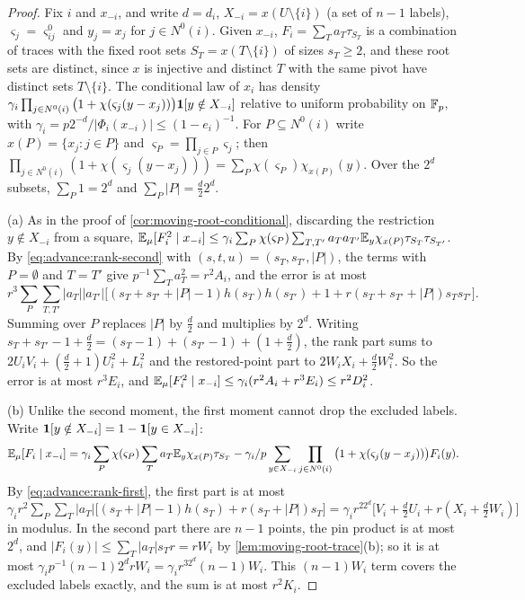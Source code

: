 \begin{proof}
Fix $i$ and $x_{-i}$, and write $d=d_i$, $X_{-i}=x(U\setminus\{i\})$ (a set of
$n-1$ labels), $\varsigma_j=\varsigma^0_{ij}$ and $y_j=x_j$ for $j\in N^0(i)$.
Given $x_{-i}$, $F_i=\sum_Ta_T\tau_{S_T}$ is a combination of traces with the
fixed root sets $S_T=x(T\setminus\{i\})$ of sizes $s_T\ge2$, and these root sets
are distinct, since $x$ is injective and distinct $T$ with the same pivot have
distinct sets $T\setminus\{i\}$. The conditional law of $x_i$ has density
$\gamma_i\prod_{j\in N^0(i)}\big(1+\chi(\varsigma_j(y-x_j))\big)\mathbf 1[y\notin X_{-i}]$
relative to uniform probability on $\mathbb F_p$, with
$\gamma_i=p2^{-d}/|\Phi_i(x_{-i})|\le(1-e_i)^{-1}$. For $P\subseteq N^0(i)$ write
$x(P)=\{x_j:j\in P\}$ and $\varsigma_P=\prod_{j\in P}\varsigma_j$; then
$\prod_{j\in N^0(i)}(1+\chi(\varsigma_j(y-x_j)))=\sum_P\chi(\varsigma_P)\chi_{x(P)}(y)$.
Over the $2^d$ subsets, $\sum_P1=2^d$ and $\sum_P|P|=\frac d22^d$.

(a) As in the proof of \cref{cor:moving-root-conditional}, discarding the
restriction $y\notin X_{-i}$ from a square,
$\mathbb E_\mu[F_i^2\mid x_{-i}]\le\gamma_i\sum_P\chi(\varsigma_P)\sum_{T,T'}a_Ta_{T'}
\mathbb E_y\chi_{x(P)}\tau_{S_T}\tau_{S_{T'}}$. By \eqref{eq:advance:rank-second} with
$(s,t,u)=(s_T,s_{T'},|P|)$, the terms with $P=\emptyset$ and $T=T'$ give
$p^{-1}\sum_Ta_T^2=r^2A_i$, and the error is at most
\[
  r^3\sum_P\sum_{T,T'}|a_T||a_{T'}|\Big[(s_T+s_{T'}+|P|-1)h(s_T)h(s_{T'})+1
  +r(s_T+s_{T'}+|P|)s_Ts_{T'}\Big].
\]
Summing over $P$ replaces $|P|$ by $\frac d2$ and multiplies by $2^d$. Writing
$s_T+s_{T'}-1+\frac d2=(s_T-1)+(s_{T'}-1)+(1+\frac d2)$, the rank part sums to
$2U_iV_i+(\frac d2+1)U_i^2+L_i^2$ and the restored-point part to
$2W_iX_i+\frac d2W_i^2$. So the error is at most $r^3E_i$, and
$\mathbb E_\mu[F_i^2\mid x_{-i}]\le\gamma_i(r^2A_i+r^3E_i)\le r^2D_i^2$.

(b) Unlike the second moment, the first moment cannot drop the excluded
labels. Write $\mathbf 1[y\notin X_{-i}]=1-\mathbf 1[y\in X_{-i}]$:
\[
  \mathbb E_\mu[F_i\mid x_{-i}]=\gamma_i\sum_P\chi(\varsigma_P)\sum_Ta_T\mathbb E_y\chi_{x(P)}\tau_{S_T}
  -\gamma_i/p\sum_{y\in X_{-i}}\prod_{j\in N^0(i)}\big(1+\chi(\varsigma_j(y-x_j))\big)F_i(y).
\]
By \eqref{eq:advance:rank-first}, the first part is at most
$\gamma_ir^2\sum_P\sum_T|a_T|\big[(s_T+|P|-1)h(s_T)+r(s_T+|P|)s_T\big]
=\gamma_ir^22^d\big[V_i+\frac d2U_i+r(X_i+\frac d2W_i)\big]$ in modulus. In the
second part there are $n-1$ points, the pin product is at most $2^d$, and
$|F_i(y)|\le\sum_T|a_T|s_Tr=rW_i$ by \cref{lem:moving-root-trace}(b); so it is
at most $\gamma_ip^{-1}(n-1)2^drW_i=\gamma_ir^32^d(n-1)W_i$. This $(n-1)W_i$ term
covers the excluded labels exactly, and the sum is at most $r^2K_i$.
\end{proof}

